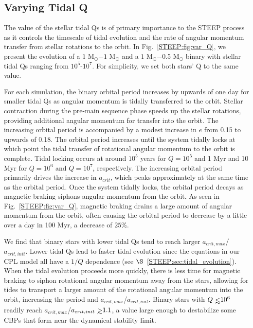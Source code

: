 \subsection{Varying Tidal Q} \label{STEEP:sec:var_Q}

The value of the stellar tidal Qs is of primary importance to the STEEP process as it controls the timescale of tidal evolution and the rate of angular momentum transfer from stellar rotations to the orbit.  In Fig.~\ref{STEEP:fig:var_Q}, we present the evolution of a $1$ M$_{\odot}$$-1$ M$_{\odot}$ and a $1$ M$_{\odot}$$-0.5$ M$_{\odot}$ binary with stellar tidal Qs ranging from $10^5$-$10^7$.  For simplicity, we set both stars' Q to the same value.  

For each simulation, the binary orbital period increases by upwards of one day for smaller tidal Qs as angular momentum is tidally transferred to the orbit.  Stellar contraction during the pre-main sequence phase speeds up the stellar rotations, providing additional angular momentum for transfer into the orbit.  The increasing orbital period is accompanied by a modest increase in $e$ from 0.15 to upwards of 0.18.  The orbital period increases until the system tidally locks at which point the tidal transfer of rotational angular momentum to the orbit is complete.  Tidal locking occurs at around $10^5$ years for $Q=10^5$ and 1 Myr and 10 Myr for $Q=10^6$ and $Q=10^7$, respectively.  The increasing orbital period primarily drives the increase in $a_{crit}$, which peaks approximately at the same time as the orbital period.  Once the system tidally locks, the orbital period decays as magnetic braking siphons angular momentum from the orbit.  As seen in Fig.~\ref{STEEP:fig:var_Q}, magnetic braking drains a large amount of angular momentum from the orbit, often causing the orbital period to decrease by a little over a day in 100 Myr, a decrease of $25\%$.

We find that binary stars with lower tidal Qs tend to reach larger $a_{crit,max}$/$a_{crit,init}$.  Lower tidal Qs lead to faster tidal evolution since the equations in our CPL model all have a $1/Q$ dependence (see $\S$~\ref{STEEP:sec:tidal_evolution}).  When the tidal evolution proceeds more quickly, there is less time for magnetic braking to siphon rotational angular momentum away from the stars, allowing for tides to transport a larger amount of the rotational angular momentum into the orbit, increasing the period and $a_{crit,max}$/$a_{crit,init}$.  Binary stars with $Q \lsim 10^6$ readily reach $a_{crit,max}$/$a_{crit,init} \gsim 1.1$, a value large enough to destabilize some CBPs that form near the dynamical stability limit.

